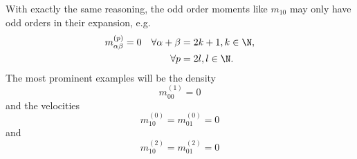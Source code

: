 With exactly the same reasoning, the odd order moments like $m_{10}$ may only have odd orders in their expansion, e.g.
\begin{equation}
  \label{eq: kill odd moments even order}
  \begin{aligned}
    m_{\alpha\beta}^{(p)} = 0 \quad
    \forall\alpha+\beta & = 2k+1, k\in\N, \\
    \forall p & = 2l, l\in\N.
  \end{aligned}
\end{equation}
The most prominent examples will be the density
\begin{equation}
  \label{eq: first order pressure zero}
  m_{00}^{(1)}=0
\end{equation}
and the velocities
\begin{equation}
  \label{eq: zeroth order velocity zero}
  m_{10}^{(0)} = m_{01}^{(0)} = 0
\end{equation}
and
\begin{equation}
  \label{eq: second order velocity zero}
  m_{10}^{(2)} = m_{01}^{(2)} = 0
\end{equation}
